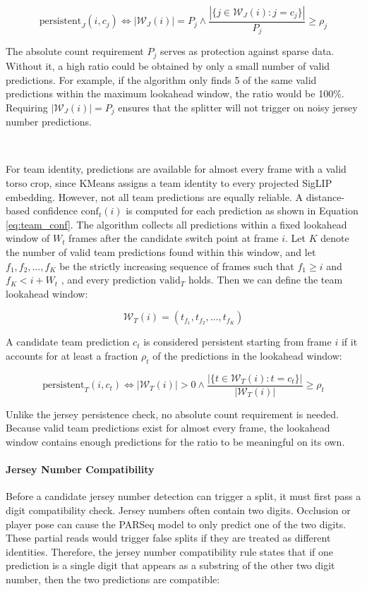 \begin{equation}
    \text{persistent}_J(i, c_j) \iff 
    |\mathcal{W}_J(i)| = P_j \land 
    \frac{|\{j \in \mathcal{W}_J(i) : j=c_j\}|}{P_j} \geq \rho_j
\end{equation}

The absolute count requirement $P_j$ serves as protection against sparse data. Without it, a high ratio could be obtained by only a small number of valid predictions. For example, if the algorithm only finds 5 of the same valid predictions within the maximum lookahead window, the ratio would be 100\%. Requiring $|\mathcal{W}_J(i)|=P_j$ ensures that the splitter will not trigger on noisy jersey number predictions. 

\

For team identity, predictions are available for almost every frame with a valid torso crop, since KMeans assigns a team identity to every projected SigLIP embedding. However, not all team predictions are equally reliable. A distance-based confidence $\text{conf}_t(i)$ is computed for each prediction as shown in Equation \ref{eq:team_conf}. The algorithm collects all predictions within a fixed lookahead window of $W_t$ frames after the candidate switch point at frame $i$. Let $K$ denote the number of valid team predictions found within this window, and let $f_{1},f_{2},\dots,f_{K}$ be the strictly increasing sequence of frames such that $f_{1} \geq i$ and $f_{K} < i + W_t$ , and every prediction $\text{valid}_T$ holds. Then we can define the team lookahead window:

\begin{equation}
    \mathcal{W}_T(i)=(t_{f_1},t_{f_2},\dots,t_{f_K})
\end{equation}

A candidate team prediction $c_t$ is considered persistent starting from frame $i$ if it accounts for at least a fraction $\rho_t$ of the predictions in the lookahead window:

\begin{equation}
    \text{persistent}_T(i,c_t) \iff |\mathcal{W}_T(i)| > 0 \land  \frac{|\{t \in \mathcal{W}_T(i):t=c_t\}|}{{|\mathcal{W}_T(i)|}} \geq \rho_t
\end{equation}

Unlike the jersey persistence check, no absolute count requirement is needed. Because valid team predictions exist for almost every frame, the lookahead window contains enough predictions for the ratio to be meaningful on its own.

\paragraph{Jersey Number Compatibility}
Before a candidate jersey number detection can trigger a split, it must first pass a digit compatibility check. Jersey numbers often contain two digits. Occlusion or player pose can cause the PARSeq model to only predict one of the two digits. These partial reads would trigger false splits if they are treated as different identities. Therefore, the jersey number compatibility rule states that if one prediction is a single digit that appears as a substring of the other two digit number, then the two predictions are compatible:


